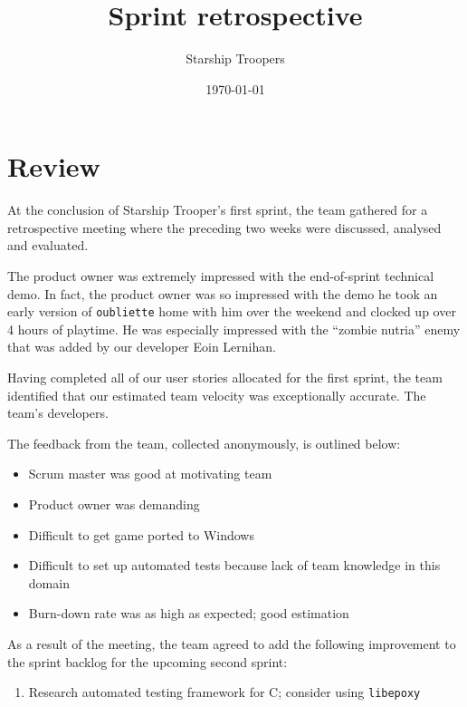 \documentclass[a4paper,11pt]{article}
\title{Sprint retrospective}
\author{Starship Troopers}
\date{\today}
\begin{document}
\maketitle

\section*{Review}
At the conclusion of Starship Trooper's first sprint, the team
gathered for a retrospective meeting where the preceding two weeks
were discussed, analysed and evaluated.

The product owner was extremely impressed with the end-of-sprint
technical demo. In fact, the product owner was so impressed with the
demo he took an early version of \texttt{oubliette} home with him
over the weekend and clocked up over 4 hours of playtime. He was
especially impressed with the ``zombie nutria'' enemy that was added
by our developer Eoin Lernihan.

Having completed all of our user stories allocated for the first
sprint, the team identified that our estimated team velocity was
exceptionally accurate. The team's developers.

The feedback from the team, collected anonymously, is outlined
below:

\begin{itemize}
\item Scrum master was good at motivating team
\item Product owner was demanding
\item Difficult to get game ported to Windows
\item Difficult to set up automated tests because lack of team
knowledge in this domain
\item Burn-down rate was as high as expected; good estimation
\end{itemize}

As a result of the meeting, the team agreed to add the following
improvement to the sprint backlog for the upcoming second sprint:

\begin{enumerate}
\item Research automated testing framework for C; consider using
\texttt{libepoxy}
\end{enumerate}
\end{document}
